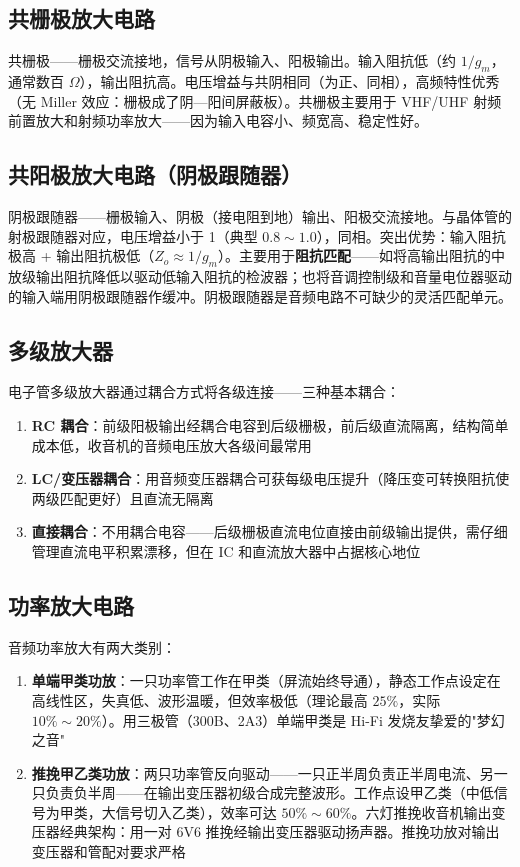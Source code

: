 \documentclass[12pt,UTF8]{ctexbook}
\begin{document}
\subsection{共栅极放大电路}

共栅极——栅极交流接地，信号从阴极输入、阳极输出。输入阻抗低（约 $1/g_m$，通常数百 $\Omega$），输出阻抗高。电压增益与共阴相同（为正、同相），高频特性优秀（无 Miller 效应：栅极成了阴—阳间屏蔽板）。共栅极主要用于 VHF/UHF 射频前置放大和射频功率放大——因为输入电容小、频宽高、稳定性好。

\subsection{共阳极放大电路（阴极跟随器）}

阴极跟随器——栅极输入、阴极（接电阻到地）输出、阳极交流接地。与晶体管的射极跟随器对应，电压增益小于 1（典型 $0.8\sim1.0$），同相。突出优势：输入阻抗极高 + 输出阻抗极低（$Z_o \approx 1/g_m$）。主要用于\textbf{阻抗匹配}——如将高输出阻抗的中放级输出阻抗降低以驱动低输入阻抗的检波器；也将音调控制级和音量电位器驱动的输入端用阴极跟随器作缓冲。阴极跟随器是音频电路不可缺少的灵活匹配单元。

\subsection{多级放大器}

电子管多级放大器通过耦合方式将各级连接——三种基本耦合：
\begin{enumerate}
\item \textbf{RC 耦合}：前级阳极输出经耦合电容到后级栅极，前后级直流隔离，结构简单成本低，收音机的音频电压放大各级间最常用
\item \textbf{LC/变压器耦合}：用音频变压器耦合可获每级电压提升（降压变可转换阻抗使两级匹配更好）且直流无隔离
\item \textbf{直接耦合}：不用耦合电容——后级栅极直流电位直接由前级输出提供，需仔细管理直流电平积累漂移，但在 IC 和直流放大器中占据核心地位
\end{enumerate}

\subsection{功率放大电路}

音频功率放大有两大类别：
\begin{enumerate}
\item \textbf{单端甲类功放}：一只功率管工作在甲类（屏流始终导通），静态工作点设定在高线性区，失真低、波形温暖，但效率极低（理论最高 $25\%$，实际 $10\%\sim20\%$）。用三极管（300B、2A3）单端甲类是 Hi-Fi 发烧友挚爱的"梦幻之音"
\item \textbf{推挽甲乙类功放}：两只功率管反向驱动——一只正半周负责正半周电流、另一只负责负半周——在输出变压器初级合成完整波形。工作点设甲乙类（中低信号为甲类，大信号切入乙类），效率可达 $50\%\sim60\%$。六灯推挽收音机输出变压器经典架构：用一对 6V6 推挽经输出变压器驱动扬声器。推挽功放对输出变压器和管配对要求严格
\end{enumerate}
\end{document}
